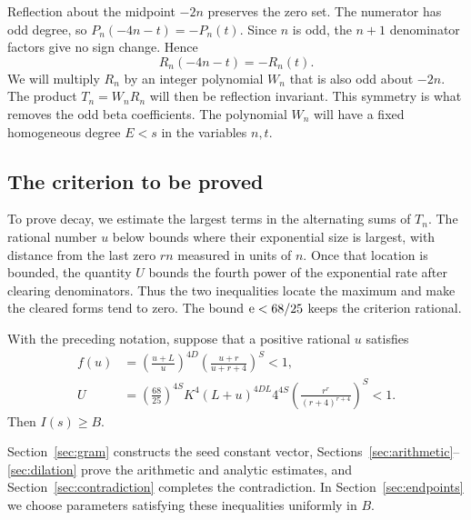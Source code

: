 Reflection about the midpoint $-2n$ preserves the zero set.
The numerator has odd degree, so
$P_n(-4n-t)=-P_n(t)$. Since $n$ is odd, the $n+1$ denominator
factors give no sign change. Hence
\[
 R_n(-4n-t)=-R_n(t).
\]
We will multiply $R_n$ by an integer polynomial $W_n$ that is also
odd about $-2n$. The product $T_n=W_nR_n$ will then be reflection
invariant. This symmetry is what removes the odd beta coefficients.
The polynomial $W_n$ will have a fixed homogeneous degree $E<s$
in the variables $n,t$.

\subsection{The criterion to be proved}

To prove decay, we estimate the largest terms in the alternating
sums of $T_n$. The rational number $u$ below bounds where their
exponential size is largest, with distance from the last zero $rn$
measured in units of $n$. Once that location is bounded, the quantity
$U$ bounds the fourth power of the exponential rate after clearing
denominators. Thus the two inequalities locate the maximum and
make the cleared forms tend to zero. The bound $\mathrm e<68/25$ keeps
the criterion rational.

\begin{proposition}\label{prop:criterion}
With the preceding notation, suppose that a positive rational $u$
satisfies
\begin{align}
 f(u)&=\left(\frac{u+L}{u}\right)^{4D}
          \left(\frac{u+r}{u+r+4}\right)^S<1,
          \label{eq:f-criterion}\\
 U&=\left(\frac{68}{25}\right)^{4S}K^4(L+u)^{4DL}4^{4S}
          \left(\frac{r^r}{(r+4)^{r+4}}\right)^S<1.
          \label{eq:U-criterion}
\end{align}
Then $I(s)\ge B$.
\end{proposition}

Section~\ref{sec:gram} constructs the seed constant vector,
Sections~\ref{sec:arithmetic}--
\ref{sec:dilation} prove the arithmetic and analytic estimates, and
Section~\ref{sec:contradiction} completes the contradiction. In
Section~\ref{sec:endpoints} we choose parameters satisfying these
inequalities uniformly in $B$.
